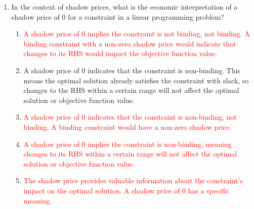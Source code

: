 \documentclass{article}%
\newcommand{\incorrect}[1]{\textcolor{red}{#1}}
\begin{document}
\begin{enumerate}
\begin{enumerate}
\begin{enumerate}
\item \incorrect{Shadow prices are not used to directly determine the optimal solution to the primal problem. The optimal solution is found by solving the primal problem.  While related, the dual problem provides information about the sensitivity of the optimal solution.}%
\item \incorrect{Shadow prices are associated with constraints, not just basic variables.  While basic variables play a role in determining shadow prices, the shadow prices themselves reflect the marginal value of relaxing a constraint.}%
\item \incorrect{Shadow prices are directly related to the dual variables. They do not represent the cost of violating a constraint; rather, they represent the value of relaxing a constraint.}%
\item \incorrect{Shadow prices are not calculated solely by sensitivity analysis on the primal problem. They are directly obtained from the optimal solution of the dual problem. Sensitivity analysis uses shadow prices to determine the range of changes that maintain the optimal basis.}%
\end{enumerate}%
\vspace{0.5em}%
\end{enumerate}%
\item In the context of shadow prices, what is the economic interpretation of a shadow price of 0 for a constraint in a linear programming problem?%
\begin{enumerate}%
\item \incorrect{A shadow price of 0 implies the constraint is not binding, not binding.  A binding constraint with a non-zero shadow price would indicate that changes to its RHS would impact the objective function value.}%
\item A shadow price of 0 indicates that the constraint is non-binding.  This means the optimal solution already satisfies the constraint with slack, so changes to the RHS within a certain range will not affect the optimal solution or objective function value.%
\item \incorrect{A shadow price of 0 indicates that the constraint is non-binding, not binding.  A binding constraint would have a non-zero shadow price.}%
\item \incorrect{A shadow price of 0 implies the constraint is non-binding, meaning changes to its RHS within a certain range will not affect the optimal solution or objective function value.}%
\item \incorrect{The shadow price provides valuable information about the constraint's impact on the optimal solution. A shadow price of 0 has a specific meaning.}%

\end{enumerate}
\end{enumerate}
\end{document}
